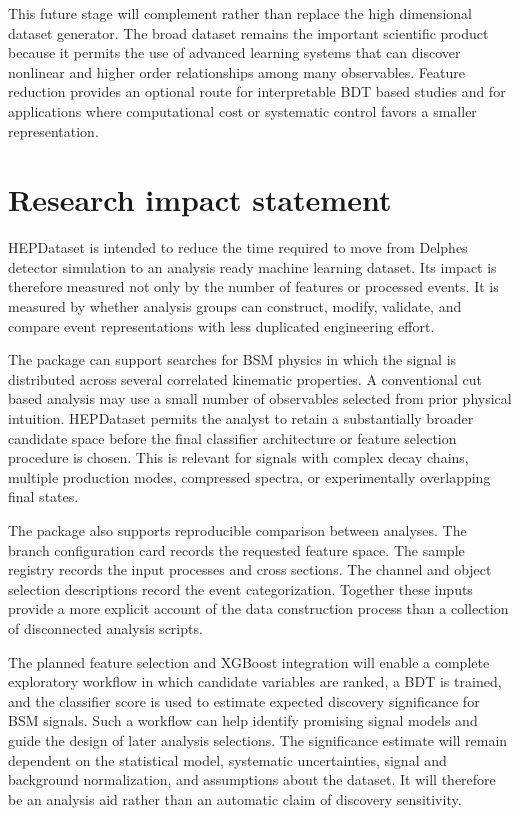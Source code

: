\documentclass[11pt,a4paper]{article}
\begin{document}
This future stage will complement rather than replace the high dimensional
dataset generator. The broad dataset remains the important scientific product
because it permits the use of advanced learning systems that can discover
nonlinear and higher order relationships among many observables. Feature
reduction provides an optional route for interpretable BDT based studies and for
applications where computational cost or systematic control favors a smaller
representation.

\section{Research impact statement}

HEPDataset is intended to reduce the time required to move from Delphes
detector simulation to an analysis ready machine learning dataset. Its impact is
therefore measured not only by the number of features or processed events. It is
measured by whether analysis groups can construct, modify, validate, and compare
event representations with less duplicated engineering effort.

The package can support searches for BSM physics in which the signal is
distributed across several correlated kinematic properties. A conventional cut
based analysis may use a small number of observables selected from prior physical
intuition. HEPDataset permits the analyst to retain a substantially broader
candidate space before the final classifier architecture or feature selection
procedure is chosen. This is relevant for signals with complex decay chains,
multiple production modes, compressed spectra, or experimentally overlapping
final states.

The package also supports reproducible comparison between analyses. The branch
configuration card records the requested feature space. The sample registry
records the input processes and cross sections. The channel and object selection
descriptions record the event categorization. Together these inputs provide a
more explicit account of the data construction process than a collection of
disconnected analysis scripts.

The planned feature selection and XGBoost integration will enable a complete
exploratory workflow in which candidate variables are ranked, a BDT is trained,
and the classifier score is used to estimate expected discovery significance for
BSM signals. Such a workflow can help identify promising signal models and guide
the design of later analysis selections. The significance estimate will remain
dependent on the statistical model, systematic uncertainties, signal and
background normalization, and assumptions about the dataset. It will therefore
be an analysis aid rather than an automatic claim of discovery sensitivity.
\end{document}
